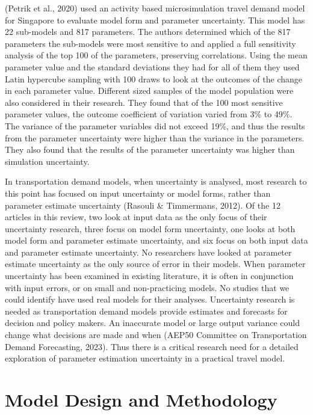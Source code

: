 \documentclass[
  letterpaper,
  number,
  review,
  3p]{elsarticle}
\begin{document}
(Petrik et al., 2020) used an activity based microsimulation travel
demand model for Singapore to evaluate model form and parameter
uncertainty. This model has 22 sub-models and 817 parameters. The
authors determined which of the 817 parameters the sub-models were most
sensitive to and applied a full sensitivity analysis of the top 100 of
the parameters, preserving correlations. Using the mean parameter value
and the standard deviations they had for all of them they used Latin
hypercube sampling with 100 draws to look at the outcomes of the change
in each parameter value. Different sized samples of the model population
were also considered in their research. They found that of the 100 most
sensitive parameter values, the outcome coefficient of variation varied
from 3\% to 49\%. The variance of the parameter variables did not exceed
19\%, and thus the results from the parameter uncertainty were higher
than the variance in the parameters. They also found that the results of
the parameter uncertainty was higher than simulation uncertainty.

In transportation demand models, when uncertainty is analysed, most
research to this point has focused on input uncertainty or model forms,
rather than parameter estimate uncertainty (Rasouli \& Timmermans,
2012). Of the 12 articles in this review, two look at input data as the
only focus of their uncertainty research, three focus on model form
uncertainty, one looks at both model form and parameter estimate
uncertainty, and six focus on both input data and parameter estimate
uncertainty. No researchers have looked at parameter estimate
uncertainty as the only source of error in their models. When parameter
uncertainty has been examined in existing literature, it is often in
conjunction with input errors, or on small and non-practicing models. No
studies that we could identify have used real models for their analyses.
Uncertainty research is needed as transportation demand models provide
estimates and forecasts for decision and policy makers. An inaccurate
model or large output variance could change what decisions are made and
when (AEP50 Committee on Transportation Demand Forecasting, 2023). Thus
there is a critical research need for a detailed exploration of
parameter estimation uncertainty in a practical travel model.


\section{Model Design and Methodology}\label{sec-methods}
\end{document}
